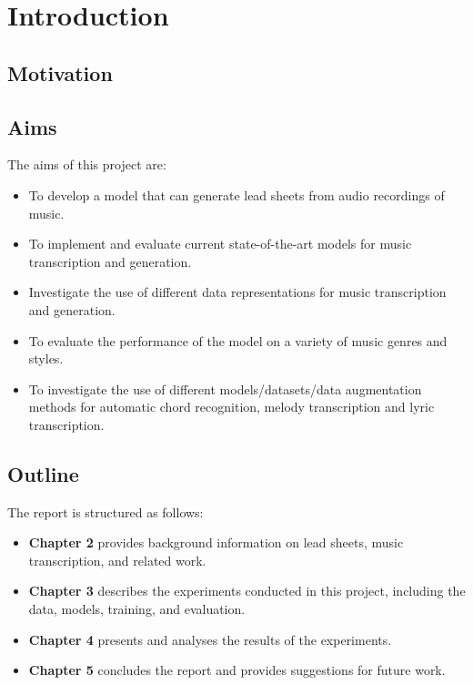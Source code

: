 \chapter{Introduction}

\section{Motivation}



\section{Aims}

The aims of this project are:
\begin{itemize}
    \item To develop a model that can generate lead sheets from audio recordings of music.
    \item To implement and evaluate current state-of-the-art models for music transcription and generation.
    \item Investigate the use of different data representations for music transcription and generation.
    \item To evaluate the performance of the model on a variety of music genres and styles.
    \item To investigate the use of different models/datasets/data augmentation methods for automatic chord recognition, melody transcription and lyric transcription.
\end{itemize}

\section{Outline}

The report is structured as follows:

\begin{itemize}
    \item \textbf{Chapter 2} provides background information on lead sheets, music transcription, and related work.
    \item \textbf{Chapter 3} describes the experiments conducted in this project, including the data, models, training, and evaluation.
    \item \textbf{Chapter 4} presents and analyses the results of the experiments.
    \item \textbf{Chapter 5} concludes the report and provides suggestions for future work.
\end{itemize}